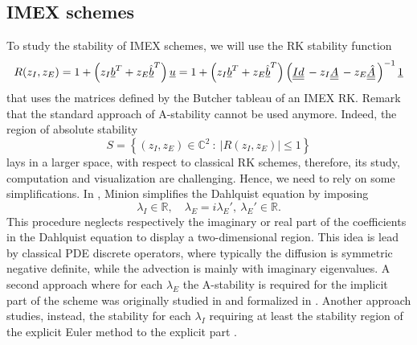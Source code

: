 \subsection{IMEX schemes}
To study the stability of IMEX schemes, we will use the RK stability function 
\begin{equation}\label{eq:ImExStabilityFunction}
R(z_I, z_E)=1+\left(z_I\vec{b}^T+z_E\vec{\hat{b}}^T\right)\vec{u}=1+\left(z_I\vec{b}^T+z_E\vec{\hat{b}}^T\right)\left(\mat{Id}-z_I\mat{A}-z_E\mat{\hat{A}}\right)^{-1} \vec{1}
\end{equation}
that uses the matrices defined by the Butcher tableau of an IMEX RK.
Remark that the standard approach of A-stability cannot be used anymore.
Indeed, the region of absolute stability $$S=\left\{(z_I,z_E)\in \mathbb{C}^2 \ : \ \lvert{R(z_I,z_E)}\rvert\le1\right\}$$ lays in a larger space, with respect to classical RK schemes, therefore, its study, computation and visualization are challenging.
Hence, we need to rely on some simplifications.
In \cite{minion2003dec}, Minion simplifies the Dahlquist equation by imposing
\begin{equation*}
\lambda_I \in \mathbb{R}, \quad \lambda_E =i\lambda_E', \ \lambda_E' \in \mathbb{R}.
\end{equation*} 
This procedure neglects respectively the imaginary or real part of the coefficients in the Dahlquist equation to display a two-dimensional region. This idea is lead by classical PDE discrete operators, where typically the diffusion is symmetric negative definite, while the advection is mainly with imaginary eigenvalues. 
A second approach where for each $\lambda_E$ the A-stability is required for the implicit part of the scheme was originally studied in \cite{zhong1996additive,caflisch1997uniformly} and formalized in \cite{liotta2000central}. Another approach studies, instead, the stability for each $\lambda_I$ requiring at least the stability region of the explicit Euler method to the explicit part \cite{Hundsdorfer}.
